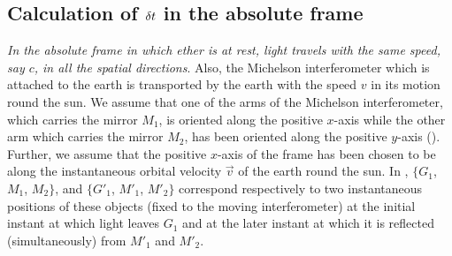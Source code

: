 \subsection{Calculation of {${\delta} t$} in 
the absolute frame}
\begin{figure}[H]
\centering
{}
\caption{} 
\label{fig3.2}
\end{figure}

\textsl{In the absolute frame in which ether is at rest, 
light travels with the \textsl{same} speed, say $c$,  in all 
the spatial directions}. Also, the Michelson interferometer 
 which is attached to the 
earth is transported by the earth with the speed $v$ in its 
motion round the sun. We assume that one of  the arms of the 
Michelson interferometer, which carries the mirror $M_1$, is 
oriented along the positive $x$-axis while the other arm 
which carries the mirror $M_2$, has been oriented along the 
positive $y$-axis (). Further, we assume that 
the positive $x$-axis of the frame has been chosen to be 
along the instantaneous orbital velocity $\vec{v}$ of the 
earth round the sun. In , $\{G_1$, $M_1$, 
$M_2\}$, and $\{G'_1$, $M'_1$, $M'_2\}$ correspond 
respectively to two instantaneous positions of these objects 
(fixed to the moving interferometer) at the initial instant 
at which light leaves $G_1$ and at the later instant at 
which it is reflected (simultaneously) from $M'_1$ and 
$M'_2$.

